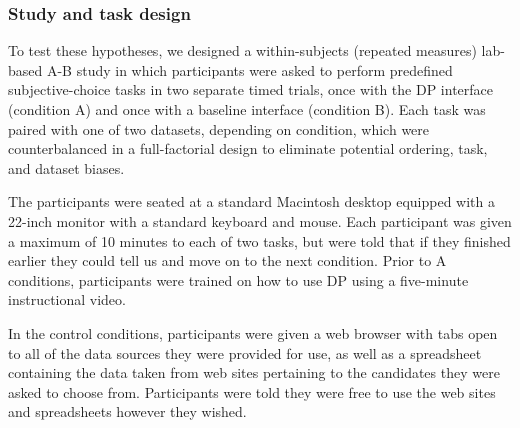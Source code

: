 \documentclass{sigchi}
\begin{document}
\subsubsection{Study and task design}
To test these hypotheses, we designed a within-subjects (repeated measures) lab-based A-B study in which participants were asked to perform predefined subjective-choice tasks in two separate timed trials, once with the DP interface (condition A) and once with a baseline interface (condition B).  Each task was paired with one of two datasets, depending on condition, which were counterbalanced in a full-factorial design to eliminate potential ordering, task, and dataset biases.

The participants were seated at a standard Macintosh desktop equipped with a 22-inch monitor with a standard keyboard and mouse. Each participant was given a maximum of 10 minutes to each of two tasks, but were told that if they finished earlier they could tell us and move on to the next condition.  Prior to A conditions, participants were trained on how to use DP using a five-minute instructional video.

In the control conditions, participants were given a web browser with tabs open to all of the data sources they were provided for use, as well as a spreadsheet containing the data taken from web sites pertaining to the candidates they were asked to choose from. Participants were told they were free to use the web sites and spreadsheets however they wished. 
\end{document}
